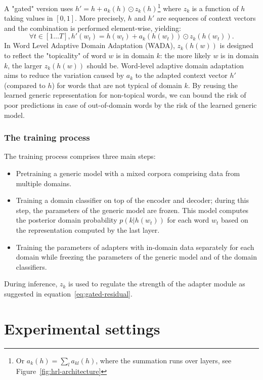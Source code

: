 \documentclass[11pt,a4paper]{article}
\begin{document}
 A "gated" version uses $h' = h + a_k(h) \odot{} z_k(h)$\footnote{Or $a_k(h) = \sum_{l} a_{kl}(h)$, where the summation runs over layers, see Figure~\ref{fig:hrl-architecture}} where $z_k$ is a function of $h$ taking values in $[0,1]$. More precisely, $h$ and $h'$ are sequences of context vectors and the combination is performed element-wise, yielding:
\begin{equation}
   \forall t \in [1 \dots{} T], h'(w_t) = h(w_t) + a_k(h(w_t)) \odot{} z_k(h(w_t)). \label{eq:gated-residual}
\end{equation}
In Word Level Adaptive Domain Adaptation (WADA), $z_k(h(w))$ is designed to reflect the "topicality" of  word $w$ is in domain $k$: the more likely $w$ is in domain $k$, the larger $z_k(h(w))$ should be. Word-level adaptive domain adaptation aims to reduce the variation caused by $a_k$ to the adapted context vector $h'$ (compared to $h$) for words that are not typical of domain $k$. By reusing the learned generic representation for non-topical words, we can bound the risk of poor predictions in case of out-of-domain words by the risk of the learned generic model.
\subsubsection*{The training process \label{sssec:train}}
The training process comprises three main steps:
\begin{itemize}
	\item Pretraining a generic model with a mixed corpora comprising data from multiple domains.
	\item Training a domain classifier on top of the encoder and decoder; during this step, the parameters of the generic model are frozen. This model computes the posterior domain probability $p(k|h(w_t))$ for each word $w_t$ based on the representation computed by the last layer.
	\item Training the parameters of adapters with in-domain data separately for each domain while freezing the parameters of the generic model and of the domain classifiers.
\end{itemize}
During inference, $z_k$ is used to regulate the strength of the adapter module as suggested in equation~\ref{eq:gated-residual}.
\section{Experimental settings \label{sec:exp}}
\end{document}
